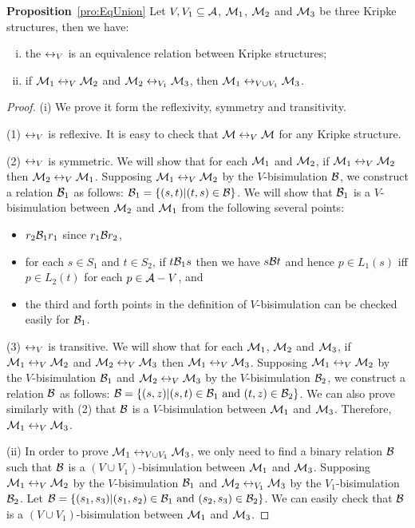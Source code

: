 \documentclass[runningheads]{llncs}
\begin{document}
\noindent\textbf{Proposition}~\ref{pro:EqUnion}
Let $V, V_1 \subseteq {\cal A}$, ${\cal M}_1$, ${\cal M}_2$ and ${\cal M}_3$ be three Kripke structures, then we have:
\begin{enumerate} [(i)]
    \item the $\leftrightarrow_V$ is an  equivalence relation between Kripke structures;
    \item if ${\cal M}_1 \leftrightarrow_V {\cal M}_2$ and ${\cal M}_2 \leftrightarrow_{V_1} {\cal M}_3$, then ${\cal M}_1 \leftrightarrow_{V \cup V_1} {\cal M}_3$.
\end{enumerate}
\begin{proof}
(i) We prove it form the reflexivity, symmetry and transitivity.

(1) $\leftrightarrow_V$ is reflexive. It is easy to check that ${\cal M}\leftrightarrow_V {\cal M}$ for any Kripke structure.

(2) $\leftrightarrow_V$ is symmetric. We will show that for each ${\cal M}_1$ and ${\cal M}_2$, if ${\cal M}_1 \leftrightarrow_V {\cal M}_2$ then ${\cal M}_2 \leftrightarrow_V {\cal M}_1$.
Supposing ${\cal M}_1 \leftrightarrow_V {\cal M}_2$ by the $V$-bisimulation ${\cal B}$, we construct a relation ${\cal B}_1$ as follows: ${\cal B}_1=\{(s,t) | (t, s)\in {\cal B}\}$. We will show that ${\cal B}_1$ is a $V$-bisimulation between ${\cal M}_2$ and ${\cal M}_1$ from the following several points:
\begin{itemize}
    \item $r_2 {\cal B}_1 r_1$ since $r_1 {\cal B} r_2$,
    \item for each $s\in S_1$ and $t\in S_2$, if $t {\cal B}_1 s$ then we have $s{\cal B} t$ and hence $p \in L_1(s)$ iff $p \in L_2(t)$ for each $p \in {\cal A} - V$, and
    \item the third and forth points in the definition of $V$-bisimulation can be checked easily for ${\cal B}_1$.
\end{itemize}

(3) $\leftrightarrow_V$ is transitive. We will show that for each ${\cal M}_1$, ${\cal M}_2$ and ${\cal M}_3$, if ${\cal M}_1 \leftrightarrow_V {\cal M}_2$ and ${\cal M}_2 \leftrightarrow_V {\cal M}_3$ then ${\cal M}_1 \leftrightarrow_V {\cal M}_3$. Supposing ${\cal M}_1 \leftrightarrow_V {\cal M}_2$ by the $V$-bisimulation ${\cal B}_1$ and ${\cal M}_2 \leftrightarrow_V {\cal M}_3$  by the $V$-bisimulation ${\cal B}_2$, we construct a relation ${\cal B}$ as follows: ${\cal B}=\{(s, z) | (s,t) \in {\cal B}_1\ \mbox{and}\ (t, z)\in {\cal B}_2\}$.
We can also prove similarly with (2) that ${\cal B}$ is a $V$-bisimulation between ${\cal M}_1$ and ${\cal M}_3$. Therefore, ${\cal M}_1 \leftrightarrow_V {\cal M}_3$.

(ii) In order to prove ${\cal M}_1 \leftrightarrow_{V\cup V_1} {\cal M}_3$, we only need to find a binary relation ${\cal B}$ such that ${\cal B}$ is a $(V\cup V_1)$-bisimulation between ${\cal M}_1$ and ${\cal M}_3$.
Supposing ${\cal M}_1 \leftrightarrow_V {\cal M}_2$ by the $V$-bisimulation ${\cal B}_1$ and ${\cal M}_2 \leftrightarrow_{V_1} {\cal M}_3$  by the $V_1$-bisimulation ${\cal B}_2$. Let $\Hb = \{(s_1, s_3)| (s_1, s_2) \in \Hb_1\ \mbox{and} \ (s_2, s_3) \in \Hb_2\}$. We can easily check that ${\cal B}$ is a $(V\cup V_1)$-bisimulation between ${\cal M}_1$ and ${\cal M}_3$.


\end{proof}
\end{document}
